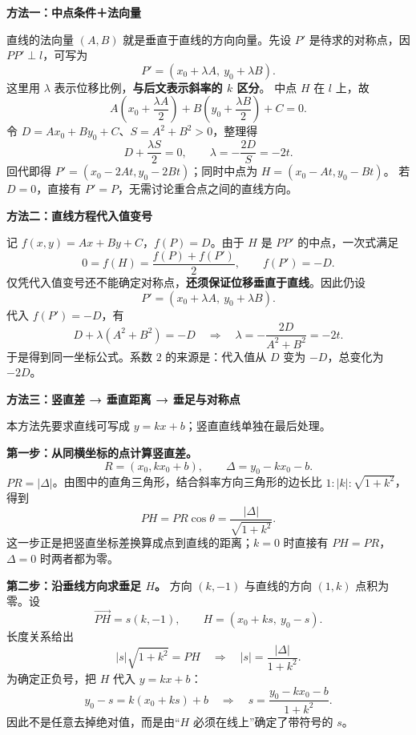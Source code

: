 \begin{proofbox}
\begin{minipage}{\linewidth}
\textbf{\textcolor{CProof}{方法一：中点条件＋法向量}}

\end{minipage}

直线的法向量 $(A,B)$ 就是垂直于直线的方向向量。先设 $P'$ 是待求的对称点，因 $PP'\perp l$，可写为
\[
 P'=(x_0+\lambda A,\ y_0+\lambda B).
\]
这里用 $\lambda$ 表示位移比例，\textbf{与后文表示斜率的 $k$ 区分}。
中点 $H$ 在 $l$ 上，故
\[
 A\left(x_0+\frac{\lambda A}{2}\right)
 +B\left(y_0+\frac{\lambda B}{2}\right)+C=0.
\]
令 $D=Ax_0+By_0+C$、$S=A^2+B^2>0$，整理得
\[
 D+\frac{\lambda S}{2}=0,
 \qquad \lambda=-\frac{2D}{S}=-2t.
\]
回代即得 $P'=(x_0-2At,y_0-2Bt)$；同时中点为 $H=(x_0-At,y_0-Bt)$。
若 $D=0$，直接有 $P'=P$，无需讨论重合点之间的直线方向。

\medskip
\begin{minipage}{\linewidth}
\textbf{\textcolor{CProof}{方法二：直线方程代入值变号}}

\end{minipage}

记 $f(x,y)=Ax+By+C$，$f(P)=D$。由于 $H$ 是 $PP'$ 的中点，一次式满足
\[
 0=f(H)=\frac{f(P)+f(P')}{2},
 \qquad f(P')=-D.
\]
仅凭代入值变号还不能确定对称点，\textbf{还须保证位移垂直于直线}。因此仍设
\[
 P'=(x_0+\lambda A,\ y_0+\lambda B).
\]
代入 $f(P')=-D$，有
\[
 D+\lambda(A^2+B^2)=-D
 \quad\Longrightarrow\quad
 \lambda=-\frac{2D}{A^2+B^2}=-2t.
\]
于是得到同一坐标公式。系数 $2$ 的来源是：代入值从 $D$ 变为 $-D$，总变化为 $-2D$。

\medskip
\begin{minipage}{\linewidth}
\textbf{\textcolor{CProof}{方法三：竖直差 → 垂直距离 → 垂足与对称点}}

\end{minipage}

本方法先要求直线可写成 $y=kx+b$；竖直直线单独在最后处理。

\textbf{第一步：从同横坐标的点计算竖直差。}
\[
 R=(x_0,kx_0+b),\qquad \Delta=y_0-kx_0-b.
\]
$PR=|\Delta|$。由图中的直角三角形，结合斜率方向三角形的边长比
$1:|k|:\sqrt{1+k^2}$，得到
\[
 \boxed{PH=PR\cos\theta
 =\frac{|\Delta|}{\sqrt{1+k^2}}}.
\]
这一步正是把竖直坐标差换算成点到直线的距离；$k=0$ 时直接有 $PH=PR$，$\Delta=0$ 时两者都为零。

\textbf{第二步：沿垂线方向求垂足 $H$。}
方向 $(k,-1)$ 与直线的方向 $(1,k)$ 点积为零。设
\[
 \overrightarrow{PH}=s(k,-1),
 \qquad H=(x_0+ks,\ y_0-s).
\]
长度关系给出
\[
 |s|\sqrt{1+k^2}=PH
 \quad\Longrightarrow\quad
 |s|=\frac{|\Delta|}{1+k^2}.
\]
为确定正负号，把 $H$ 代入 $y=kx+b$：
\[
 y_0-s=k(x_0+ks)+b
 \quad\Longrightarrow\quad
 \boxed{s=\frac{y_0-kx_0-b}{1+k^2}}.
\]
因此不是任意去掉绝对值，而是由“$H$ 必须在线上”确定了带符号的 $s$。


\end{proofbox}
